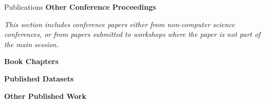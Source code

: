 \documentclass{resume} %
\begin{document}
\begin{rSection}{Publications}
\textbf{Other Conference Proceedings}

\textit{This section includes conference papers either from non-computer science conferences, or from papers submitted to workshops where the paper is not part of the main session.}

\printbibliography[keyword = conference, heading=none]

\textbf{Book Chapters}
\printbibliography[keyword = book, heading=none]


\textbf{Published Datasets}
\printbibliography[keyword = dataset, heading=none]

\textbf{Other Published Work}
\printbibliography[keyword = other, heading=none]


%
% 
% 

%
\end{rSection}

%
\end{document}
